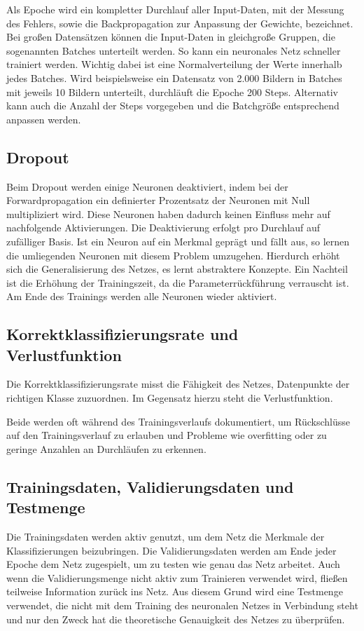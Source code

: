 Als Epoche wird ein kompletter Durchlauf aller Input-Daten, mit der Messung des Fehlers, 
sowie die Backpropagation zur Anpassung der Gewichte, bezeichnet. Bei großen Datensätzen 
können die Input-Daten in gleichgroße Gruppen, die sogenannten Batches unterteilt werden. 
So kann ein neuronales Netz schneller trainiert werden. Wichtig dabei ist eine Normalverteilung 
der Werte innerhalb jedes Batches. Wird beispielsweise ein Datensatz von 2.000 Bildern in 
Batches mit jeweils 10 Bildern unterteilt, durchläuft die Epoche 200 Steps. Alternativ kann 
auch die Anzahl der Steps vorgegeben und die Batchgröße entsprechend anpassen werden.\cite{Becker:2018c}

\subsection{Dropout}

Beim Dropout werden einige Neuronen deaktiviert, indem bei der Forwardpropagation ein
definierter Prozentsatz der Neuronen mit Null multipliziert wird. Diese Neuronen haben
dadurch keinen Einfluss mehr auf nachfolgende Aktivierungen. Die Deaktivierung erfolgt
pro Durchlauf auf zufälliger Basis. Ist ein Neuron auf ein Merkmal geprägt und fällt aus,
so lernen die umliegenden Neuronen mit diesem Problem umzugehen. Hierdurch erhöht
sich die Generalisierung des Netzes, es lernt abstraktere Konzepte. Ein Nachteil ist die
Erhöhung der Trainingszeit, da die Parameterrückführung verrauscht ist. Am Ende des
Trainings werden alle Neuronen wieder aktiviert. \cite{Becker:2018c}

\subsection{Korrektklassifizierungsrate und Verlustfunktion}

Die Korrektklassifizierungsrate misst die Fähigkeit des Netzes, Datenpunkte der richtigen
Klasse zuzuordnen. Im Gegensatz hierzu steht die Verlustfunktion. \cite{Chollet:2018}

Beide werden oft während des Trainingsverlaufs dokumentiert, um Rückschlüsse
auf den Trainingsverlauf zu erlauben und Probleme wie overfitting oder zu geringe Anzahlen an Durchläufen
zu erkennen.

\subsection{Trainingsdaten, Validierungsdaten und Testmenge}
	Die Trainingsdaten werden aktiv genutzt, um dem Netz die Merkmale der Klassifizierungen beizubringen. 
	Die Validierungsdaten werden am Ende jeder Epoche dem Netz
	zugespielt, um zu testen wie genau das Netz arbeitet. Auch wenn die Validierungsmenge
	nicht aktiv zum Trainieren verwendet wird, fließen teilweise Information zurück ins Netz.
	Aus diesem Grund wird eine Testmenge verwendet, die nicht mit dem Training des neuronalen Netzes in 
	Verbindung steht und nur den Zweck hat die theoretische Genauigkeit
	des Netzes zu überprüfen. \cite{Becker:2018}

